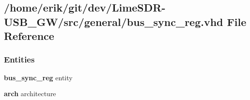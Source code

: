 \subsection{/home/erik/git/dev/\+Lime\+S\+D\+R-\/\+U\+S\+B\+\_\+\+G\+W/src/general/bus\+\_\+sync\+\_\+reg.vhd File Reference}
\label{bus__sync__reg_8vhd}
\subsubsection*{Entities}
\begin{DoxyCompactItemize}
\item 
{\bf bus\+\_\+sync\+\_\+reg} entity
\item 
{\bf arch} architecture
\end{DoxyCompactItemize}

